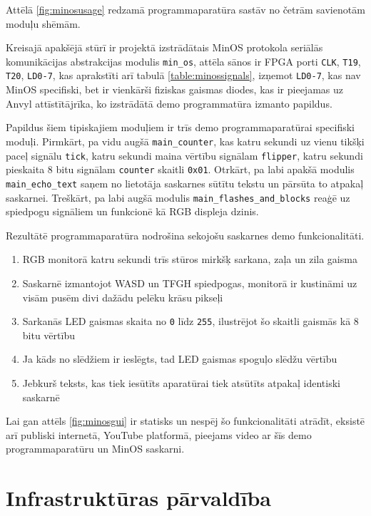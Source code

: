 Attēlā \ref{fig:minosusage} redzamā programmaparatūra sastāv no četrām
savienotām moduļu shēmām. 

Kreisajā apakšējā stūrī ir projektā izstrādātais MinOS protokola seriālās
komunikācijas abstrakcijas modulis \lstinline!min_os!, attēla sānos ir FPGA
porti \lstinline!CLK!, \lstinline!T19!, \lstinline!T20!, \lstinline!LD0-7!, kas
aprakstīti arī tabulā \ref{table:minossignals}, izņemot \lstinline!LD0-7!, kas
nav MinOS specifiski, bet ir vienkārši fiziskas gaismas diodes, kas ir pieejamas
uz Anvyl attīstītājrīka, ko izstrādātā demo programmatūra izmanto papildus. 

Papildus šiem tipiskajiem moduļiem ir trīs demo programmaparatūrai specifiski
moduļi. Pirmkārt, pa vidu augšā \lstinline!main_counter!, kas katru sekundi uz
vienu tikšķi paceļ signālu \lstinline!tick!, katru sekundi maina vērtību
signālam \lstinline!flipper!, katru sekundi pieskaita 8 bitu signālam
\lstinline!counter! skaitli \lstinline!0x01!. Otrkārt, pa labi apakšā modulis
\lstinline!main_echo_text! saņem no lietotāja saskarnes sūtītu tekstu un pārsūta
to atpakaļ saskarnei. Treškārt, pa labi augšā modulis
\lstinline!main_flashes_and_blocks! reaģē uz spiedpogu signāliem un funkcionē kā
RGB displeja dzinis.

Rezultātē programmaparatūra nodrošina sekojošu saskarnes demo funkcionalitāti.
\begin{enumerate}
    \item RGB monitorā katru sekundi trīs stūros mirkšķ sarkana, zaļa un zila
        gaisma
    \item Saskarnē izmantojot WASD un TFGH spiedpogas, monitorā ir kustināmi uz
        visām pusēm divi dažādu pelēku krāsu pikseļi
    \item Sarkanās LED gaismas skaita no \lstinline!0! līdz \lstinline!255!,
        ilustrējot šo skaitli gaismās kā 8 bitu vērtību
    \item Ja kāds no slēdžiem ir ieslēgts, tad LED gaismas spoguļo slēdžu
        vērtību
    \item Jebkurš teksts, kas tiek iesūtīts aparatūrai tiek atsūtīts atpakaļ
        identiski saskarnē
\end{enumerate}

Lai gan attēls \ref{fig:minosgui} ir statisks un nespēj šo funkcionalitāti
atrādīt, eksistē arī publiski internetā, YouTube platformā, pieejams video ar
šīs demo programmaparatūru un MinOS saskarni.
\cite{VeinbahsKrisjanisDemo} 

\section{Infrastruktūras pārvaldība}
\label{sec:ops}

